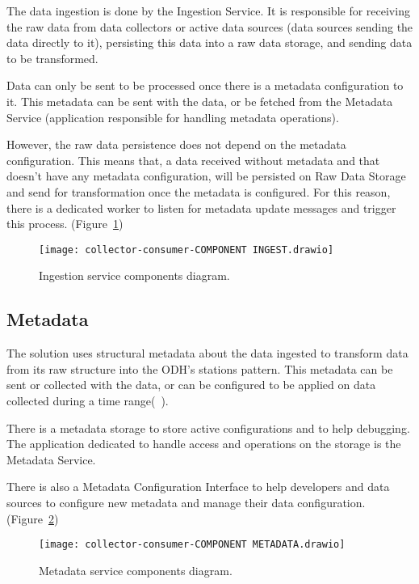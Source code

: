 The data ingestion is done by the Ingestion Service. It is responsible for receiving the raw data from data collectors or active data sources (data sources sending the data directly to it), persisting this data into a raw data storage, and sending data to be transformed.

Data can only be sent to be processed once there is a metadata configuration to it. This metadata can be sent with the data, or be fetched from the Metadata Service (application responsible for handling metadata operations).

However, the raw data persistence does not depend on the metadata configuration. This means that, a data received without metadata and that doesn't have any metadata configuration, will be persisted on Raw Data Storage and send for transformation once the metadata is configured. For this reason, there is a dedicated worker to listen for metadata update messages and trigger this process. (Figure~\ref{fig:ingest})

\begin{figure}
    \centering
    \texttt{[image: collector-consumer-COMPONENT INGEST.drawio]}
    \caption{Ingestion service components diagram.\label{fig:ingest}}
\end{figure}

\subsection{Metadata}
\label{sec:metadata}

The solution uses structural metadata about the data ingested to transform data from its raw structure into the ODH's stations pattern. This metadata can be sent or collected with the data, or can be configured to be applied on data collected during a time range(~\cite{Metadata}).

There is a metadata storage to store active configurations and to help debugging. The application dedicated to handle access and operations on the storage is the Metadata Service.

There is also a Metadata Configuration Interface to help developers and data sources to configure new metadata and manage their data configuration. (Figure~\ref{fig:metadata})

\begin{figure}
    \centering
    \texttt{[image: collector-consumer-COMPONENT METADATA.drawio]}
    \caption{Metadata service components diagram.\label{fig:metadata}}
\end{figure}

